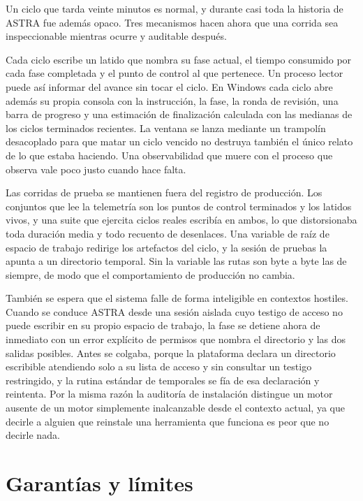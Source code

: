 \documentclass[11pt,a4paper]{article}
\begin{document}
Un ciclo que tarda veinte minutos es normal, y durante casi toda la historia de ASTRA fue además opaco. Tres mecanismos hacen ahora que una corrida sea inspeccionable mientras ocurre y auditable después.

Cada ciclo escribe un latido que nombra su fase actual, el tiempo consumido por cada fase completada y el punto de control al que pertenece. Un proceso lector puede así informar del avance sin tocar el ciclo. En Windows cada ciclo abre además su propia consola con la instrucción, la fase, la ronda de revisión, una barra de progreso y una estimación de finalización calculada con las medianas de los ciclos terminados recientes. La ventana se lanza mediante un trampolín desacoplado para que matar un ciclo vencido no destruya también el único relato de lo que estaba haciendo. Una observabilidad que muere con el proceso que observa vale poco justo cuando hace falta.

Las corridas de prueba se mantienen fuera del registro de producción. Los conjuntos que lee la telemetría son los puntos de control terminados y los latidos vivos, y una suite que ejercita ciclos reales escribía en ambos, lo que distorsionaba toda duración media y todo recuento de desenlaces. Una variable de raíz de espacio de trabajo redirige los artefactos del ciclo, y la sesión de pruebas la apunta a un directorio temporal. Sin la variable las rutas son byte a byte las de siempre, de modo que el comportamiento de producción no cambia.

También se espera que el sistema falle de forma inteligible en contextos hostiles. Cuando se conduce ASTRA desde una sesión aislada cuyo testigo de acceso no puede escribir en su propio espacio de trabajo, la fase se detiene ahora de inmediato con un error explícito de permisos que nombra el directorio y las dos salidas posibles. Antes se colgaba, porque la plataforma declara un directorio escribible atendiendo solo a su lista de acceso y sin consultar un testigo restringido, y la rutina estándar de temporales se fía de esa declaración y reintenta. Por la misma razón la auditoría de instalación distingue un motor ausente de un motor simplemente inalcanzable desde el contexto actual, ya que decirle a alguien que reinstale una herramienta que funciona es peor que no decirle nada.

\section{Garantías y límites}
\end{document}
